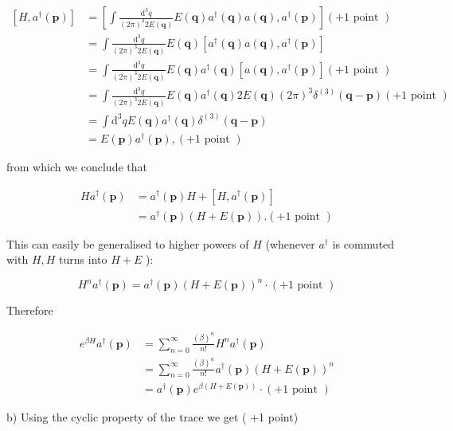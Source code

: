 \documentclass[10pt, letterpaper]{article}
\begin{document}
$$
\begin{aligned}
{\left[H, a^{\dagger}(\mathbf{p})\right] } & =\left[\int \frac{\mathrm{d}^3 q}{(2 \pi)^3 2 E(\mathbf{q})} E(\mathbf{q}) a^{\dagger}(\mathbf{q}) a(\mathbf{q}), a^{\dagger}(\mathbf{p})\right](+1 \text { point }) \\
& =\int \frac{\mathrm{d}^3 q}{(2 \pi)^3 2 E(\mathbf{q})} E(\mathbf{q})\left[a^{\dagger}(\mathbf{q}) a(\mathbf{q}), a^{\dagger}(\mathbf{p})\right] \\
& =\int \frac{\mathrm{d}^3 q}{(2 \pi)^3 2 E(\mathbf{q})} E(\mathbf{q}) a^{\dagger}(\mathbf{q})\left[a(\mathbf{q}), a^{\dagger}(\mathbf{p})\right](+1 \text { point }) \\
& =\int \frac{\mathrm{d}^3 q}{(2 \pi)^3 2 E(\mathbf{q})} E(\mathbf{q}) a^{\dagger}(\mathbf{q}) 2 E(\mathbf{q})(2 \pi)^3 \delta^{(3)}(\mathbf{q}-\mathbf{p})(+1 \text { point }) \\
& =\int \mathrm{d}^3 q E(\mathbf{q}) a^{\dagger}(\mathbf{q}) \delta^{(3)}(\mathbf{q}-\mathbf{p}) \\
& =E(\mathbf{p}) a^{\dagger}(\mathbf{p}),(+1 \text { point })
\end{aligned}
$$

from which we conclude that

$$
\begin{aligned}
H a^{\dagger}(\mathbf{p}) & =a^{\dagger}(\mathbf{p}) H+\left[H, a^{\dagger}(\mathbf{p})\right] \\
& =a^{\dagger}(\mathbf{p})(H+E(\mathbf{p})) .(+1 \text { point })
\end{aligned}
$$


This can easily be generalised to higher powers of $H$ (whenever $a^{\dagger}$ is commuted with $H, H$ turns into $H+E$ ):

$$
H^n a^{\dagger}(\mathbf{p})=a^{\dagger}(\mathbf{p})(H+E(\mathbf{p}))^n \cdot(+1 \text { point })
$$


Therefore

$$
\begin{aligned}
e^{\beta H} a^{\dagger}(\mathbf{p}) & =\sum_{n=0}^{\infty} \frac{(\beta)^n}{n!} H^n a^{\dagger}(\mathbf{p}) \\
& =\sum_{n=0}^{\infty} \frac{(\beta)^n}{n!} a^{\dagger}(\mathbf{p})(H+E(\mathbf{p}))^n \\
& =a^{\dagger}(\mathbf{p}) e^{\beta(H+E(\mathbf{p}))} \cdot(+1 \text { point })
\end{aligned}
$$


b) Using the cyclic property of the trace we get ( +1 point)
\end{document}

